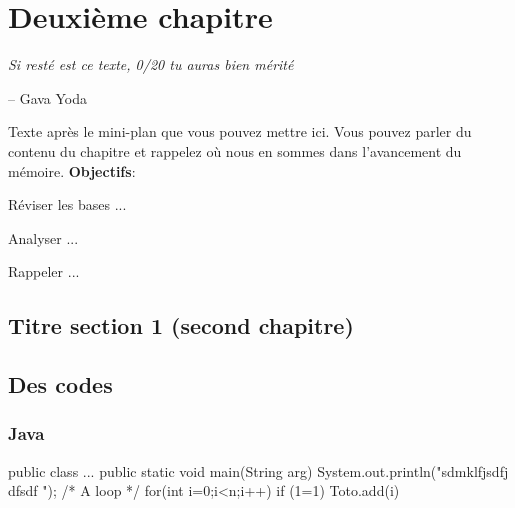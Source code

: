 \chapter{Deuxième chapitre}
\label{chap:two}

\epigraph{\itshape Si resté est ce texte, 0/20 tu auras bien mérité}{-- Gava Yoda}

\stopcontents[chapters]
\startcontents[chapters]

\printMyMinitoc

Texte après le mini-plan que vous pouvez mettre ici. Vous pouvez parler du contenu du chapitre et rappelez où nous en sommes dans l'avancement du mémoire.\newline
{\noindent \color{colorEPISEN-MEMOIRE}\textbf{Objectifs}}:
\begin{itemizeEPISEN}
	\item Réviser les bases ...
	\item Analyser ... 
	\item Rappeler ...
\end{itemizeEPISEN}

\fancyhead[LE]{\textsc{\chaptername~\thechapter}}



\section{Titre section 1 (second chapitre)}
\label{sec:two:one}

\lipsum[4] 

\lipsum[5] 

\section{Des codes}
\label{sec:two:two}

\lipsum[6]

\subsection{Java}

\lipsum[7]

\begin{java}
public class {
	...
	public static void main(String arg){
		System.out.println("sdmklfjsdfj dfsdf ");
		/* A loop */
		for(int i=0;i<n;i++)
			if (1=1)
				Toto.add(i)
	}
}
\end{java}

